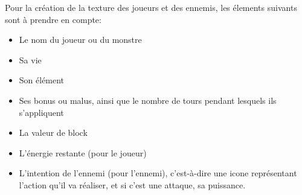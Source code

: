 Pour la création de la texture des joueurs et des ennemis, les élements suivants sont à prendre en compte:
\begin{itemize}
    \item Le nom du joueur ou du monstre
    \item Sa vie
    \item Son élément
    \item Ses bonus ou malus, ainsi que le nombre de tours pendant lesquels ils s'appliquent
    \item La valeur de block
    \item L'énergie restante (pour le joueur)
    \item L'intention de l'ennemi (pour l'ennemi), c'est-à-dire une icone représentant l'action qu'il va réaliser, et si c'est une attaque, sa puissance.
\end{itemize}
\newpage
